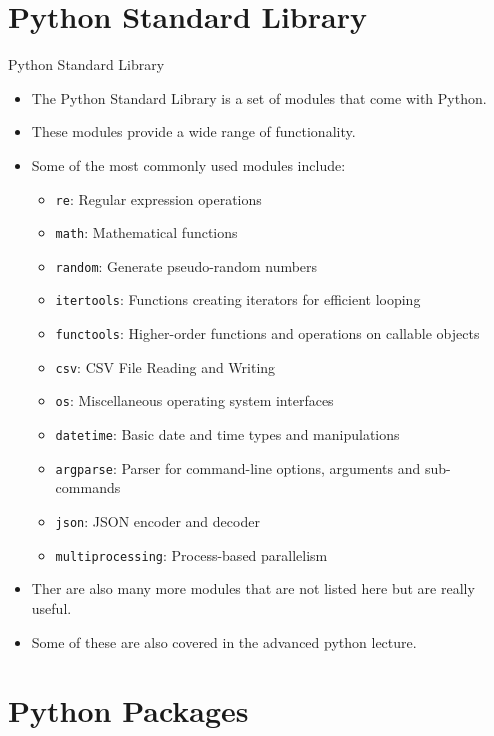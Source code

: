 \documentclass[aspectratio=169]{beamer}
\begin{document}
\section{Python Standard Library}

\begin{frame}{Python Standard Library}
    \begin{itemize}
        \item The Python Standard Library is a set of modules that come with Python.
        \item These modules provide a wide range of functionality.
        \item Some of the most commonly used modules include:
              \begin{itemize}
                \item \texttt{re}: Regular expression operations
                \item \texttt{math}: Mathematical functions
                \item \texttt{random}: Generate pseudo-random numbers
                \item \texttt{itertools}: Functions creating iterators for efficient looping
                \item \texttt{functools}: Higher-order functions and operations on callable objects
                \item \texttt{csv}: CSV File Reading and Writing
                \item \texttt{os}: Miscellaneous operating system interfaces
                \item \texttt{datetime}: Basic date and time types and manipulations
                \item \texttt{argparse}: Parser for command-line options, arguments and sub-commands
                \item \texttt{json}: JSON encoder and decoder
                \item \texttt{multiprocessing}: Process-based parallelism
            \end{itemize}
        \item Ther are also many more modules that are not listed here but are really useful.
        \item Some of these are also covered in the advanced python lecture.
    \end{itemize}
\end{frame}


\section{Python Packages}
\end{document}
